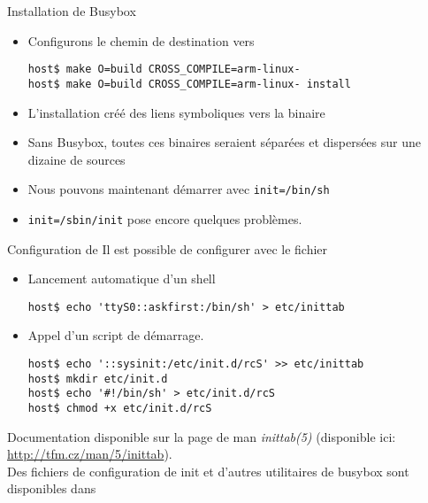 \begin{frame}[fragile=singleslide]{Installation de Busybox}
  \begin{itemize}
  \item Configurons le chemin de destination vers 
    \begin{lstlisting}
host$ make O=build CROSS_COMPILE=arm-linux-
host$ make O=build CROSS_COMPILE=arm-linux- install
    \end{lstlisting}
  \item  L'installation créé  des  liens symboliques  vers la  binaire
  \item  Sans  Busybox,  toutes  ces  binaires  seraient  séparées  et
    dispersées sur une dizaine de sources
  \item Nous pouvons maintenant démarrer avec \verb+init=/bin/sh+
  \item \verb+init=/sbin/init+ pose encore quelques problèmes.
  \end{itemize}
\end{frame}

\begin{frame}[fragile=singleslide]{Configuration de }
  Il est possible de configurer  avec le fichier
  \begin{itemize}
  \item Lancement automatique d'un shell
    \begin{lstlisting}
host$ echo 'ttyS0::askfirst:/bin/sh' > etc/inittab 
    \end{lstlisting}
  \item Appel d'un script de démarrage.
    \begin{lstlisting}
host$ echo '::sysinit:/etc/init.d/rcS' >> etc/inittab 
host$ mkdir etc/init.d
host$ echo '#!/bin/sh' > etc/init.d/rcS
host$ chmod +x etc/init.d/rcS
    \end{lstlisting}
  \end{itemize}
  Documentation disponible sur la page de man \emph{inittab(5)}
  (disponible ici: \url{http://tfm.cz/man/5/inittab}).\\[2ex]
  Des  fichiers de  configuration  de init  et  d'autres utilitaires  de
  busybox sont disponibles dans 
\end{frame}

